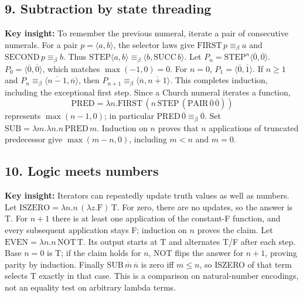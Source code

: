 \documentclass[11pt]{article}
\newcommand{\insight}[1]{\par\medskip\noindent\textbf{Key insight:} #1}
\begin{document}
\subsection*{9. Subtraction by state threading}
\insight{To remember the previous numeral, iterate a pair of consecutive numerals.}
For a pair $p=\langle a,b\rangle$, the selector laws give $\mathrm{FIRST}\,p\equiv_\beta a$ and $\mathrm{SECOND}\,p\equiv_\beta b$. Thus $\mathrm{STEP}\langle a,b\rangle\equiv_\beta\langle b,\mathrm{SUCC}\,b\rangle$.
Let $P_n=\mathrm{STEP}^n\langle\overline0,\overline0\rangle$. $P_0=\langle\overline0,\overline0\rangle$, which matches $\max(-1,0)=0$. For $n=0$, $P_1=\langle\overline0,\overline1\rangle$. If $n\ge1$ and $P_n\equiv_\beta\langle\overline{n-1},\overline n\rangle$, then $P_{n+1}\equiv_\beta\langle\overline n,\overline{n+1}\rangle$. This completes induction, including the exceptional first step.
Since a Church numeral iterates a function,
\[\mathrm{PRED}=\lambda n.\mathrm{FIRST}\,(n\,\mathrm{STEP}\,(\mathrm{PAIR}\,\overline0\,\overline0))\]
represents $\max(n-1,0)$; in particular PRED$\,\overline0\equiv_\beta\overline0$. Set $\mathrm{SUB}=\lambda m.\lambda n.n\,\mathrm{PRED}\,m$. Induction on $n$ proves that $n$ applications of truncated predecessor give $\max(m-n,0)$, including $m<n$ and $m=0$.

\subsection*{10. Logic meets numbers}
\insight{Iterators can repeatedly update truth values as well as numbers.}
Let $\mathrm{ISZERO}=\lambda n.n\,(\lambda z.\mathrm{F})\,\mathrm{T}$.
For zero, there are no updates, so the answer is T. For $n+1$ there is at least one application of the constant-F function, and every subsequent application stays F; induction on $n$ proves the claim.
Let $\mathrm{EVEN}=\lambda n.n\,\mathrm{NOT}\,\mathrm{T}$. Its output starts at T and alternates T/F after each step. Base $n=0$ is T; if the claim holds for $n$, NOT flips the answer for $n+1$, proving parity by induction. Finally SUB$\,\overline m\,\overline n$ is zero iff $m\le n$, so ISZERO of that term selects T exactly in that case. This is a comparison on natural-number encodings, not an equality test on arbitrary lambda terms.
\end{document}
